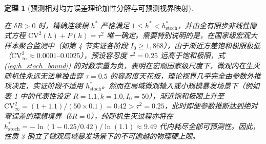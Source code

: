 \documentclass[11pt,a4paper]{article}
\theoremstyle{plain}
\newtheorem{theorem}{定理}
\theoremstyle{definition}
\begin{document}
\begin{theorem}[预测相对均方误差理论加性分解与可预测视界映射]
\begin{enumerate}
在 $\delta R > 0$ 时，精确连续根 $h^*$ 严格满足 $1 \le h^* < h^*_{\text{stoch}}$，并由全有限步非线性隐式方程 $\text{CV}^2(h) + P(h) = \tau^2$ 唯一确定。需要特别说明的是，在国家级宏观大样本聚合监测中（如第 4 节实证各阶段 $I_0 \ge 1,868$），由于渐近方差饱和极限极低（$\text{CV}^2_\infty \approx 0.0001\text{--}0.0025$），预设容忍度 $\tau^2 = 0.25$ 远高于饱和极限，式 (\ref{eq:h_stoch_bound}) 的对数宗量为负，表明在宏观国家级尺度下，微观内在生灭随机性永远无法单独击穿 $\tau = 0.5$ 的容忍度天花板，理论视界几乎完全由参数外推项决定，实证阶段不适用 $h^*_{\text{stoch}}$。然而在局域微观输入或小规模暴发场景下（例如表 1 中的代表性设定 $R=1.1, k=1.0, I_0=50$），渐近饱和极限上升至 $\text{CV}^2_\infty = (1+1.1)/(50 \times 0.1) = 0.42 > \tau^2 = 0.25$，此时即便参数推断达到绝对零误差的理想境界（$\delta R = 0$），纯随机生灭过程亦将在 $h^*_{\text{stoch}} = -\ln(1 - 0.25/0.42)/\ln(1.1) \approx 9.49$ 代内耗尽全部可预测性。因此，性质 3 确立了微观局域暴发场景下的不可逾越的物理硬上限。
\end{enumerate}
\end{theorem}
\end{document}
